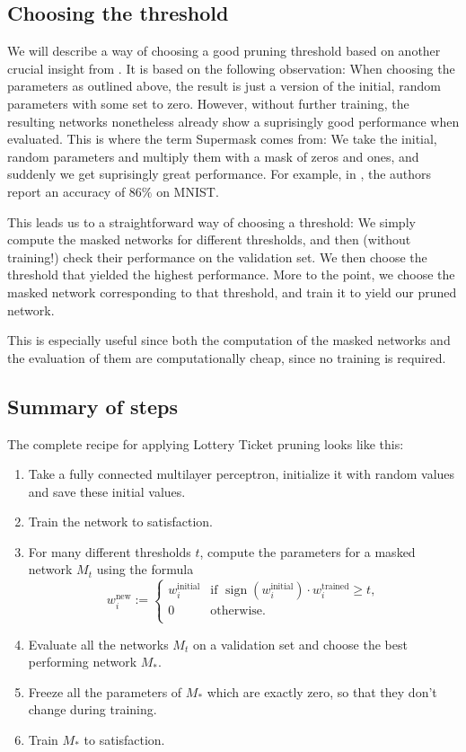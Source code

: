 \documentclass[12pt,final,twoside]{article}
\theoremstyle{plain}
\theoremstyle{definition}
\theoremstyle{remark}
\theoremstyle{named}
\begin{document}
\subsection{Choosing the threshold}
We will describe a way of choosing a good pruning threshold based on another crucial insight from \cite{supermask}. It is based on the following observation: When choosing the parameters as outlined above, the result is just a version of the initial, random parameters with some set to zero. However, without further training, the resulting networks nonetheless already show a suprisingly good performance when evaluated. This is where the term Supermask comes from: We take the initial, random parameters and multiply them with a mask of zeros and ones, and suddenly we get suprisingly great performance. For example, in \cite{supermask}, the authors report an accuracy of $86\%$ on MNIST.

This leads us to a straightforward way of choosing a threshold: We simply compute the masked networks for different thresholds, and then (without training!) check their performance on the validation set. We then choose the threshold that yielded the highest performance. More to the point, we choose the masked network corresponding to that threshold, and train it to yield our pruned network.

This is especially useful since both the computation of the masked networks and the evaluation of them are computationally cheap, since no training is required.

\subsection{Summary of steps}
The complete recipe for applying Lottery Ticket pruning looks like this:
\begin{enumerate}[noitemsep]
\item Take a fully connected multilayer perceptron, initialize it with random values and save these initial values.
\item Train the network to satisfaction.
\item For many different thresholds $t$, compute the parameters for a masked network $M_t$ using the formula
$$
w_i^{\text{new}} := \begin{cases}
w_i^{\text{initial}} & \text{if } \operatorname{sign}\left(w_i^{\text{initial}} \right) \cdot w_i^{\text{trained}} \geq t, \\ 
0 & \text{otherwise.} \\
\end{cases}
$$
\item Evaluate all the networks $M_t$ on a validation set and choose the best performing network $M_\ast$.
\item Freeze all the parameters of $M_\ast$ which are exactly zero, so that they don't change during training.
\item Train $M_\ast$ to satisfaction.
\end{enumerate}
\end{document}
